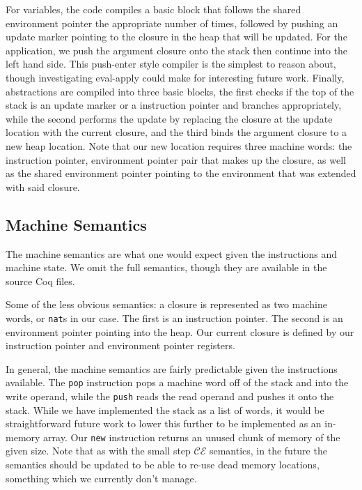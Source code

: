 For variables, the code compiles a basic block that follows the shared
environment pointer the appropriate number of times, followed by pushing an
update marker pointing to the closure in the heap that will be updated. For
the application, we push the argument closure onto the stack then continue
into the left hand side. This push-enter style compiler is the simplest to 
reason about, though investigating eval-apply could make for interesting future
work. Finally, abstractions are compiled into three basic blocks, the first checks
if the top of the stack is an update marker or a instruction pointer and branches
appropriately, while the second performs the update by replacing the closure 
at the update location with the current closure, and the third binds the 
argument closure to a new heap location. Note that our new location requires three
machine words: the instruction pointer, environment pointer pair that makes 
up the closure, as well as the shared environment pointer pointing to the 
environment that was extended with said closure. 

\subsection{Machine Semantics}

The machine semantics are what one would expect given the instructions and
machine state. We omit the full semantics, though they are available in the
source Coq files.

Some of the less obvious semantics: a closure is represented as two machine
words, or \texttt{nat}s in our case. The first is an instruction pointer. The
second is an environment pointer pointing into the heap. Our current closure is
defined by our instruction pointer and environment pointer registers. 

In general, the machine semantics are fairly predictable given the instructions 
available. The \texttt{pop} instruction pops a machine word off of the stack and
into the write operand, while the \texttt{push} reads the read operand and pushes
it onto the stack. While we have implemented the stack as a list of words, it 
would be straightforward future work to lower this further to be implemented as
an in-memory array. Our \texttt{new} instruction returns an unused chunk of
memory of the given size. Note that as with the small step $\mathcal{CE}$ semantics,
in the future the semantics should be updated to be able to re-use dead memory
locations, something which we currently don't manage. 

